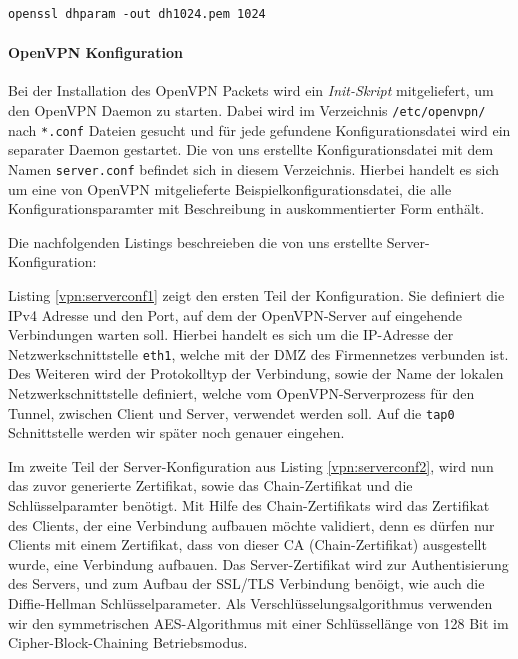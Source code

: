 \begin{lstlisting}
openssl dhparam -out dh1024.pem 1024
\end{lstlisting}


\paragraph{OpenVPN Konfiguration} Bei der Installation des OpenVPN Packets wird ein \emph{Init-Skript} mitgeliefert, um den OpenVPN Daemon zu starten. Dabei wird im Verzeichnis \texttt{/etc/openvpn/} nach \texttt{*.conf} Dateien gesucht und für jede gefundene Konfigurationsdatei wird ein separater Daemon gestartet. Die von uns erstellte Konfigurationsdatei mit dem Namen \texttt{server.conf} befindet sich in diesem Verzeichnis. Hierbei handelt es sich um eine von OpenVPN mitgelieferte Beispielkonfigurationsdatei, die alle Konfigurationsparamter mit Beschreibung in auskommentierter Form enthält.

Die nachfolgenden Listings beschreieben die von uns erstellte Server-Konfiguration:



Listing \ref{vpn:serverconf1} zeigt den ersten Teil der Konfiguration. Sie definiert die IPv4 Adresse und den Port, auf dem der OpenVPN-Server auf eingehende Verbindungen warten soll. Hierbei handelt es sich um die IP-Adresse der Netzwerkschnittstelle \texttt{eth1}, welche mit der DMZ des Firmennetzes verbunden ist. Des Weiteren wird der Protokolltyp der Verbindung, sowie der Name der lokalen Netzwerkschnittstelle definiert, welche vom OpenVPN-Serverprozess für den Tunnel, zwischen Client und Server, verwendet werden soll. Auf die \texttt{tap0} Schnittstelle werden wir später noch genauer eingehen.



Im zweite Teil der Server-Konfiguration aus Listing \ref{vpn:serverconf2}, wird nun das zuvor generierte Zertifikat, sowie das Chain-Zertifikat und die Schlüsselparamter benötigt. Mit Hilfe des Chain-Zertifikats wird das Zertifikat des Clients, der eine Verbindung aufbauen möchte validiert, denn es dürfen nur Clients mit einem Zertifikat, dass von dieser CA (Chain-Zertifikat) ausgestellt wurde, eine Verbindung aufbauen. Das Server-Zertifikat wird zur Authentisierung des Servers, und zum Aufbau der SSL/TLS Verbindung benöigt, wie auch die Diffie-Hellman Schlüsselparameter. Als Verschlüsselungsalgorithmus verwenden wir den symmetrischen AES-Algorithmus mit einer Schlüssellänge von 128 Bit im Cipher-Block-Chaining Betriebsmodus.

